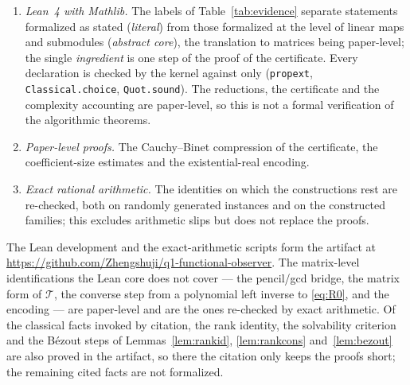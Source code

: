 \documentclass[journal]{IEEEtran}
\theoremstyle{plainn}
\theoremstyle{remark}
\begin{document}
\begin{enumerate}
\item \emph{Lean~4 with Mathlib.} The labels of Table~\ref{tab:evidence} separate statements
formalized as stated (\emph{literal}) from those formalized at the level of linear maps and
submodules (\emph{abstract core}), the translation to matrices being paper-level; the single
\emph{ingredient} is one step of the proof of the certificate. Every declaration is checked by the
kernel against only (\texttt{propext}, \texttt{Classical.choice}, \texttt{Quot.sound}). The
reductions, the certificate and the complexity accounting are paper-level, so this is not a formal
verification of the algorithmic theorems.
\item \emph{Paper-level proofs.} The Cauchy--Binet compression of the certificate, the coefficient-size estimates and the existential-real encoding.
\item \emph{Exact rational arithmetic.} The identities on which the constructions rest are re-checked, both on randomly generated instances and on the constructed families; this excludes arithmetic slips but does not replace the proofs.
\end{enumerate}

The Lean development and the exact-arithmetic scripts form the artifact at
\url{https://github.com/Zhengshuji/q1-functional-observer}. The matrix-level identifications the Lean
core does not cover --- the pencil/gcd bridge, the matrix form of $\mathcal T$, the converse step from
a polynomial left inverse to \eqref{eq:R0}, and the encoding --- are paper-level and are the ones
re-checked by exact arithmetic. Of the classical facts invoked by citation, the rank identity, the
solvability criterion and the B\'ezout steps of Lemmas~\ref{lem:rankid}, \ref{lem:rankcons}
and~\ref{lem:bezout} are also proved in the artifact, so there the citation only keeps the proofs
short; the remaining cited facts are not formalized.
\end{document}
